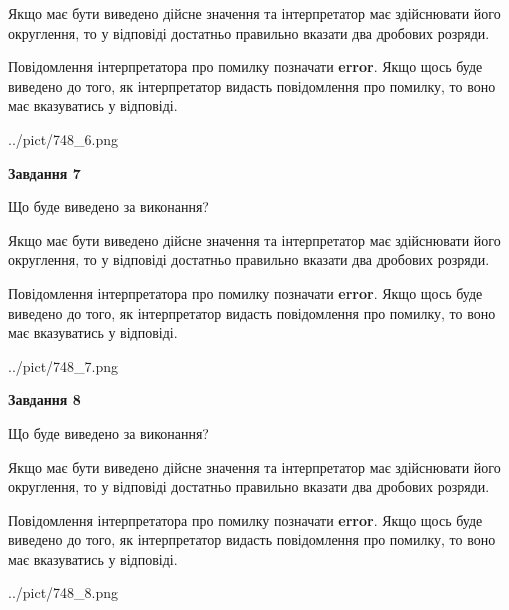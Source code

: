 \documentclass[12pt, ukrainian]{article}
\begin{document}
{\begin {Large}
Якщо має бути виведено дійсне значення та інтерпретатор має здійснювати його округлення, 
то у відповіді достатньо правильно вказати два дробових розряди.

Повідомлення інтерпретатора про помилку позначати \textbf{error}.
Якщо щось буде виведено до того, як інтерпретатор видасть повідомлення про помилку, 
то воно має вказуватись у відповіді. \par

\begin{center}
	{../pict/748_6.png}
\end{center}
\newpage

{\begin {center}\textbf{Завдання 7}\end {center}}\par
Що буде виведено за виконання? \par

Якщо має бути виведено дійсне значення та інтерпретатор має здійснювати його округлення, 
то у відповіді достатньо правильно вказати два дробових розряди.

Повідомлення інтерпретатора про помилку позначати \textbf{error}.
Якщо щось буде виведено до того, як інтерпретатор видасть повідомлення про помилку, 
то воно має вказуватись у відповіді. \par

\begin{center}
	{../pict/748_7.png}
\end{center}
\newpage

{\begin {center}\textbf{Завдання 8}\end {center}}\par
Що буде виведено за виконання? \par

Якщо має бути виведено дійсне значення та інтерпретатор має здійснювати його округлення, 
то у відповіді достатньо правильно вказати два дробових розряди.

Повідомлення інтерпретатора про помилку позначати \textbf{error}.
Якщо щось буде виведено до того, як інтерпретатор видасть повідомлення про помилку, 
то воно має вказуватись у відповіді. \par

\begin{center}
	{../pict/748_8.png}
\end{center}
\newpage


\end{Large}}
\end{document}
